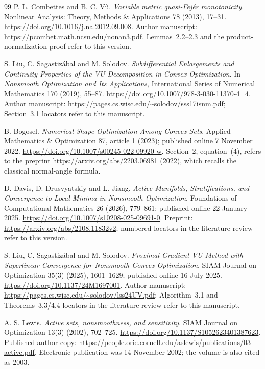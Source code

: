 \begin{thebibliography}{99}
P. L. Combettes and B. C. V\~u. \emph{Variable metric quasi-Fej\'er monotonicity}. Nonlinear Analysis: Theory, Methods \& Applications 78 (2013), 17--31. \url{https://doi.org/10.1016/j.na.2012.09.008}. Author manuscript: \url{https://pcombet.math.ncsu.edu/nonan3.pdf}. Lemmas~2.2--2.3 and the product-normalization proof refer to this version.

S. Liu, C. Sagastiz\'abal and M. Solodov. \emph{Subdifferential Enlargements and Continuity Properties of the VU-Decomposition in Convex Optimization}. In \emph{Nonsmooth Optimization and Its Applications}, International Series of Numerical Mathematics 170 (2019), 55--87. \url{https://doi.org/10.1007/978-3-030-11370-4_4}. Author manuscript: \url{https://pages.cs.wisc.edu/~solodov/sss17isnm.pdf}; Section~3.1 locators refer to this manuscript.

B. Bogosel. \emph{Numerical Shape Optimization Among Convex Sets}. Applied Mathematics \& Optimization 87, article 1 (2023); published online 7 November 2022. \url{https://doi.org/10.1007/s00245-022-09920-w}. Section~2, equation~(4), refers to the preprint \url{https://arxiv.org/abs/2203.06981} (2022), which recalls the classical normal-angle formula.

D. Davis, D. Drusvyatskiy and L. Jiang. \emph{Active Manifolds, Stratifications, and Convergence to Local Minima in Nonsmooth Optimization}. Foundations of Computational Mathematics 26 (2026), 779--861; published online 22 January 2025. \url{https://doi.org/10.1007/s10208-025-09691-0}. Preprint: \url{https://arxiv.org/abs/2108.11832v2}; numbered locators in the literature review refer to this version.

S. Liu, C. Sagastiz\'abal and M. Solodov. \emph{Proximal Gradient VU-Method with Superlinear Convergence for Nonsmooth Convex Optimization}. SIAM Journal on Optimization 35(3) (2025), 1601--1629; published online 16 July 2025. \url{https://doi.org/10.1137/24M1697001}. Author manuscript: \url{https://pages.cs.wisc.edu/~solodov/lss24UV.pdf}; Algorithm~3.1 and Theorems~3.3/4.4 locators in the literature review refer to this manuscript.

A. S. Lewis. \emph{Active sets, nonsmoothness, and sensitivity}. SIAM Journal on Optimization 13(3) (2002), 702--725. \url{https://doi.org/10.1137/S1052623401387623}. Published author copy: \url{https://people.orie.cornell.edu/aslewis/publications/03-active.pdf}. Electronic publication was 14 November 2002; the volume is also cited as 2003.


\end{thebibliography}
